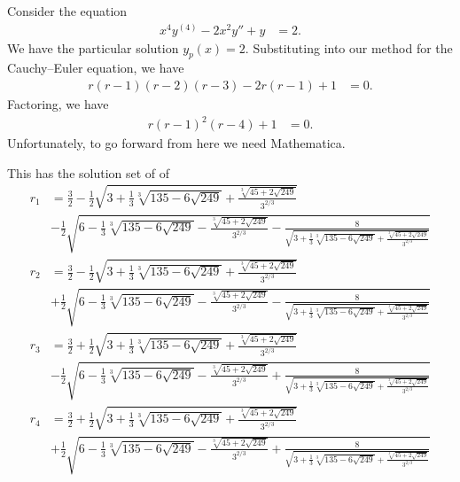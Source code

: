 \documentclass[10pt]{mypackage}
\begin{document}
\begin{example}
  Consider the equation
  \begin{align*}
    x^4y^{(4)} - 2x^2y'' + y &= 2.
  \end{align*}
  We have the particular solution $y_p(x) = 2$. Substituting into our method for the Cauchy--Euler equation, we have
  \begin{align*}
    r\left(r-1\right)\left(r-2\right)\left(r-3\right) - 2r\left(r-1\right) + 1 &= 0.
  \end{align*}
  Factoring, we have
  \begin{align*}
    r\left(r-1\right)^2\left(r-4\right) + 1 &= 0.
  \end{align*}
  Unfortunately, to go forward from here we need Mathematica.\newline

  This has the solution set of of
  \begin{align*}
    r_1 &=\frac{3}{2}-\frac{1}{2} \sqrt{3+\frac{1}{3} \sqrt[3]{135-6 \sqrt{249}}+\frac{\sqrt[3]{45+2
   \sqrt{249}}}{3^{2/3}}}\\
      &-\frac{1}{2} \sqrt{6-\frac{1}{3} \sqrt[3]{135-6 \sqrt{249}}-\frac{\sqrt[3]{45+2
   \sqrt{249}}}{3^{2/3}}-\frac{8}{\sqrt{3+\frac{1}{3} \sqrt[3]{135-6 \sqrt{249}}+\frac{\sqrt[3]{45+2
   \sqrt{249}}}{3^{2/3}}}}}\\
          r_2 &=\frac{3}{2}-\frac{1}{2} \sqrt{3+\frac{1}{3} \sqrt[3]{135-6 \sqrt{249}}+\frac{\sqrt[3]{45+2
   \sqrt{249}}}{3^{2/3}}}\\
            &+\frac{1}{2} \sqrt{6-\frac{1}{3} \sqrt[3]{135-6 \sqrt{249}}-\frac{\sqrt[3]{45+2
   \sqrt{249}}}{3^{2/3}}-\frac{8}{\sqrt{3+\frac{1}{3} \sqrt[3]{135-6 \sqrt{249}}+\frac{\sqrt[3]{45+2
   \sqrt{249}}}{3^{2/3}}}}}\\
                r_3 &=\frac{3}{2}+\frac{1}{2} \sqrt{3+\frac{1}{3} \sqrt[3]{135-6 \sqrt{249}}+\frac{\sqrt[3]{45+2
   \sqrt{249}}}{3^{2/3}}}\\
                  &-\frac{1}{2} \sqrt{6-\frac{1}{3} \sqrt[3]{135-6 \sqrt{249}}-\frac{\sqrt[3]{45+2
   \sqrt{249}}}{3^{2/3}}+\frac{8}{\sqrt{3+\frac{1}{3} \sqrt[3]{135-6 \sqrt{249}}+\frac{\sqrt[3]{45+2
   \sqrt{249}}}{3^{2/3}}}}}\\
                      r_4&=\frac{3}{2}+\frac{1}{2} \sqrt{3+\frac{1}{3} \sqrt[3]{135-6 \sqrt{249}}+\frac{\sqrt[3]{45+2
   \sqrt{249}}}{3^{2/3}}}\\
                       &+\frac{1}{2} \sqrt{6-\frac{1}{3} \sqrt[3]{135-6 \sqrt{249}}-\frac{\sqrt[3]{45+2
   \sqrt{249}}}{3^{2/3}}+\frac{8}{\sqrt{3+\frac{1}{3} \sqrt[3]{135-6 \sqrt{249}}+\frac{\sqrt[3]{45+2
   \sqrt{249}}}{3^{2/3}}}}}
  \end{align*}
  
\end{example}
\end{document}
